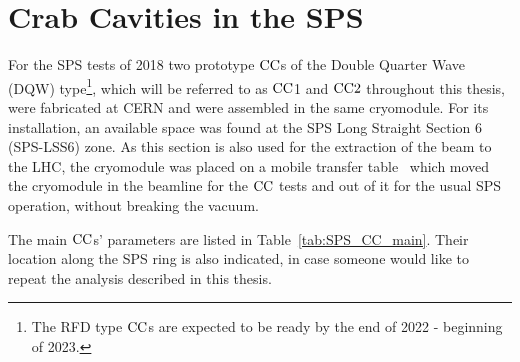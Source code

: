 \section{Crab Cavities in the SPS}\label{sec:CCs_sps_details}
For the SPS tests of 2018 two prototype ${\mathrm{CC}}$s of the Double Quarter Wave (DQW) type\footnote{The RFD type ${\mathrm{CC}}$s are expected to be ready by the end of 2022 - beginning of 2023.}, which will be referred to as ${\mathrm{CC}}$1 and ${\mathrm{CC}}2$ throughout this thesis, were fabricated at CERN and were assembled in the same cryomodule. %
For its installation, an available space was found at the SPS Long Straight Section 6 (SPS-LSS6) zone. As this section is also used for the extraction of the beam to the LHC, the cryomodule was placed on a mobile transfer table~\cite{Calaga:2649807} which moved the cryomodule in the beamline for the ${\mathrm{CC}}$ tests and out of it for the usual SPS operation, without breaking the vacuum.
 
 The main ${\mathrm{CC}}$s' parameters are listed in Table~\ref{tab:SPS_CC_main}. Their location along the SPS ring is also indicated, in case someone would like to repeat the analysis described in this thesis.

